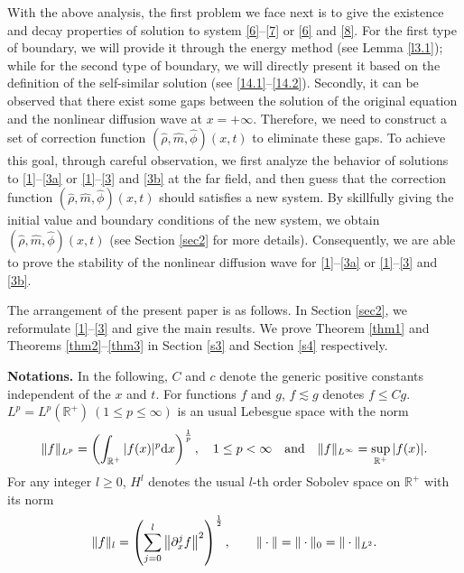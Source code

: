\documentclass[11pt]{article}
\theoremstyle{plain}
\numberwithin{equation}{section}
\begin{document}
With the above analysis, the first problem we face next is to give the existence and decay properties of solution to system \eqref{6}--\eqref{7} or \eqref{6} and \eqref{8}.
For the first type of boundary, we will provide it through the energy method (see Lemma \ref{l3.1}); while for the second type of boundary, we will directly present it based on the definition of the self-similar solution (see \eqref{14.1}--\eqref{14.2}).
Secondly, it can be observed that there exist some gaps between the solution of the original equation and the nonlinear diffusion wave at $x=+\infty$.
Therefore, we need to construct a set of correction function $(\hat\rho,\hat m,\hat\phi)(x,t)$ to eliminate these gaps. 
To achieve this goal, through careful observation, we first analyze the behavior of solutions to \eqref{1}--\eqref{3a} or \eqref{1}--\eqref{3} and \eqref{3b} at the far field,
and then guess that the correction function $(\hat\rho,\hat m,\hat\phi)(x,t)$ should satisfies a new system. 	
By skillfully giving the initial value and boundary conditions of the new system, we obtain $(\hat\rho,\hat m,\hat\phi)(x,t)$ (see Section \ref{sec2} for more details). 
Consequently, we are able to prove the stability of the nonlinear diffusion wave for \eqref{1}--\eqref{3a} or \eqref{1}--\eqref{3} and \eqref{3b}.
	
	The arrangement of the present paper is as follows.
	In Section \ref{sec2}, we reformulate \eqref{1}--\eqref{3} and give the main results.
	We prove Theorem \ref{thm1} and Theorems \ref{thm2}--\ref{thm3} in Section \ref{s3} and Section \ref{s4} respectively.

\vspace{3mm}
	
	{\bf Notations.}
In the following, $C$ and $c$ denote the generic positive constants independent of the $x$ and $t$. For functions $f$  and $g$, $f\lesssim g$ denotes $f \leq C g$.
$L^{p}=L^{p}(\mathbb{R}^{+}) ~ (1\leq p\leq \infty)$ is an usual Lebesgue space with the norm
\begin{equation}\notag
 \|f\|_{L^{p}}=\left(\int_{\mathbb{R}^{+}}|f(x)|^{p}{\rm d}x\right)^{\frac{1}{p}}, ~~~ 1\leq p< \infty~~~\mbox{and} ~~~ \|f\|_{L^{\infty}}=\sup \limits_{\mathbb{R}^{+}}|f(x)|.
\end{equation}
For any integer $l \geq 0$, $H^{l}$ denotes the usual $l$-th order Sobolev space on $\mathbb{R}^{+}$ with its norm
\begin{equation}\notag
 \|f\|_{l}=\left(\sum_{j=0}^{l}\left\|\partial_{x}^{j} f\right\|^{2}\right)^{\frac{1}{2}}, ~~~ \quad\|\cdot\|=\|\cdot\|_{0}=\|\cdot\|_{L^{2}}.
\end{equation}
\end{document}
